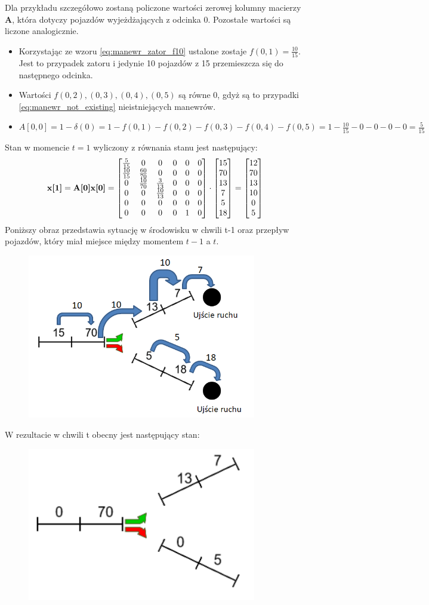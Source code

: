\documentclass[12pt]{book}
\theoremstyle{plain}
\begin{document}
\def \xt{\begin{bmatrix} 
		12 \\ 70 \\ 13 \\ 10 \\ 0 \\ 5	
\end{bmatrix}}\noindent
Dla przykładu szczegółowo zostaną policzone wartości zerowej kolumny macierzy $\textbf{A}$, która dotyczy pojazdów wyjeżdżających z odcinka 0. Pozostałe wartości są liczone analogicznie.
\begin{itemize}
	\item Korzystając ze wzoru \ref{eq:manewr_zator_f10} ustalone zostaje $f(0,1)=\frac{10}{15}$. Jest to przypadek zatoru i jedynie 10 pojazdów z 15 przemieszcza się do następnego odcinka.
	\item Wartości $f(0,2),(0,3),(0,4),(0,5)$ są równe $0$, gdyż są to przypadki \ref{eq:manewr_not_existing} nieistniejących manewrów.
	\item $A[0,0]=1-\delta(0)=1-f(0,1)-f(0,2)-f(0,3)-f(0,4)-f(0,5)=1- \frac{10}{15} -0-0-0-0= \frac{5}{15}$
\end{itemize}
Stan w momencie $t=1$ wyliczony z równania stanu jest następujący:
\[\textbf{x[1]}=\textbf{A[0]x[0]}=\AcaseZero \cdot \xtMinusI = \xt \]
Poniższy obraz przedstawia sytuację w środowisku w chwili t-1 oraz przepływ pojazdów, który miał miejsce między momentem $t-1$ a $t$.
\begin{figure}[H]
	\centering
	\includegraphics[width=10cm]{images/env_11_przeplyw_korek}
	\label{fig:env_11_case_0_przeplyw}
\end{figure}\noindent
W rezultacie w chwili t obecny jest następujący stan:
\begin{figure}[H]
	\centering
	\includegraphics[width=10cm]{images/env_11_po_korku}
	\label{fig:env_11_case_0_po_przeplywie}
\end{figure}\noindent
\end{document}
